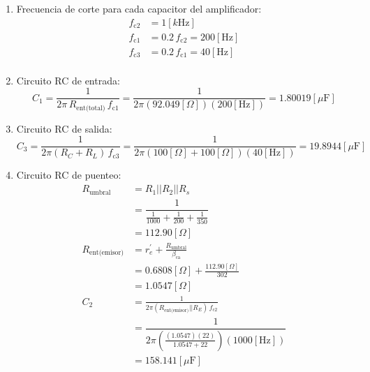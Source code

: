 \begin{enumerate}
\item Frecuencia de corte para cada capacitor del amplificador:
\begin{equation*}
    \begin{split}
        f_{\text{c2}} &= 1[k\text{Hz}]\\
        f_{\text{c1}} &= 0.2\,f_{\text{c2}} = 200[\text{Hz}]\\
        f_{\text{c3}} &= 0.2\,f_{\text{c1}} = 40[\text{Hz}]\\
    \end{split}
\end{equation*}
\item Circuito RC de entrada:
\begin{equation*}
    C_1 = \frac{1}{2\pi\,R_{\text{ent(total)}}\,f_{\text{c1}}}
    = \frac{1}{2\pi(92.049[\Omega])(200[\text{Hz}])}
    = 1.80019[\mu\text{F}]
\end{equation*}
\item Circuito RC de salida:
\begin{equation*}
    C_3 = \frac{1}{2\pi(R_C + R_L)\,f_{\text{c3}}}
        = \frac{1}{2\pi(100[\Omega]+100[\Omega])(40[\text{Hz}])}
        = 19.8944[\mu\text{F}]
\end{equation*}
\item Circuito RC de puenteo:
\begin{equation*}
    \begin{split}
        R_{\text{umbral}} &= R_1 || R_2 || R_s\\
                          &= \dfrac{1}{\frac{1}{1000}+\frac{1}{200}+\frac{1}{350}}\\
                          &= 112.90[\Omega]\\
        R_{\text{ent(emisor)}} &= r_e^{'} + \frac{R_{\text{umbral}}}{\beta_{\text{ca}}}\\
                               &= 0.6808[\Omega]+\frac{112.90[\Omega]}{302}\\
                               &= 1.0547[\Omega]\\
        C_2 &= \frac{1}{2\pi(R_{\text{ent(emisor)}} || R_E)\,f_{\text{c2}}}\\
            &= \dfrac{1}{2\pi\left(\frac{(1.0547)(22)}{1.0547+22}\right)(1000[\text{Hz}])}\\
            &= 158.141[\mu\text{F}]\\
    \end{split}
\end{equation*}
\end{enumerate}

